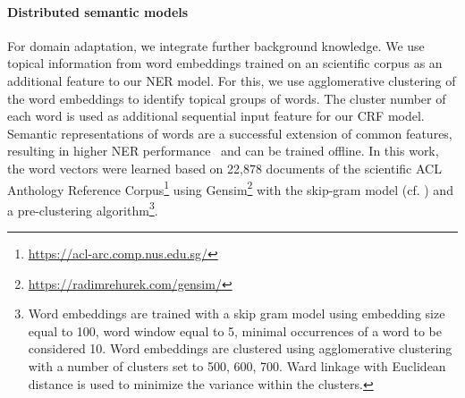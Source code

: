 \paragraph{Distributed semantic models}%
\label{subsec:dist-model}
For domain adaptation, we integrate further background knowledge.
We use topical information from word embeddings trained on an scientific corpus as an additional feature to our NER model.
For this, we use agglomerative clustering of the word embeddings to identify topical groups of words.
The cluster number of each word is used as additional sequential input feature for our CRF model.
Semantic representations of words are a successful extension of common features, resulting in higher NER performance~\cite{Turian} and can be trained offline.
In this work, the word vectors were learned based on 22,878 documents of the scientific ACL Anthology Reference Corpus\footnote{\url{https://acl-arc.comp.nus.edu.sg/}} using Gensim\footnote{\url{https://radimrehurek.com/gensim/}} with the skip-gram model (cf. \cite{mikolov2013distributed}) 
and a pre-clustering algorithm\footnote{
Word embeddings are trained with a skip gram model using embedding size equal to 100, word window equal to 5, minimal occurrences of a word to be considered 10. Word embeddings are clustered using agglomerative clustering with a number of clusters set to {500, 600, 700}. Ward linkage with Euclidean distance is used to minimize the variance within the clusters.}.

